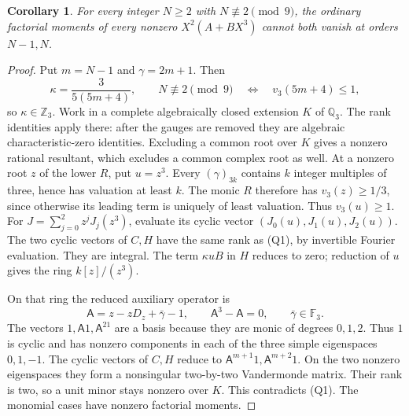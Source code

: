 \documentclass[11pt]{article}
\newtheorem{corollary}[theorem]{Corollary}
\begin{document}
\begin{corollary}\label{cor:gap-three-lower-two-eight-ninths}
For every integer $N\ge2$ with $N\not\equiv2\pmod9$, the ordinary
factorial moments of every nonzero $X^2(A+BX^3)$ cannot both vanish
at orders $N-1,N$.
\end{corollary}
\begin{proof}
Put $m=N-1$ and $\gamma=2m+1$. Then
\[
 \kappa=\frac3{5(5m+4)},\qquad
 N\not\equiv2\pmod9\quad\Longleftrightarrow\quad
                         v_3(5m+4)\le1,
\]
so $\kappa\in\mathbb Z_3$.
Work in a complete algebraically closed extension $K$ of $\mathbb Q_3$.
The rank identities apply there: after the gauges are removed they
are algebraic characteristic-zero identities.
Excluding a common root over $K$ gives a nonzero rational resultant,
which excludes a common complex root as well.
At a nonzero root $z$ of the lower $R$, put $u=z^3$.
Every $(\gamma)_{3k}$ contains $k$ integer multiples of three, hence
has valuation at least $k$. The monic $R$ therefore has
$v_3(z)\ge1/3$, since otherwise its leading term is uniquely of
least valuation. Thus $v_3(u)\ge1$.
For $J=\sum_{j=0}^2z^jJ_j(z^3)$, evaluate its cyclic vector
$(J_0(u),J_1(u),J_2(u))$. The two cyclic vectors of $C,H$
have the same rank as (Q1), by invertible Fourier evaluation.
They are integral. The term $\kappa uB$ in $H$ reduces to zero;
reduction of $u$ gives the ring $k[z]/(z^3)$.

On that ring the reduced auxiliary operator is
\[
 \mathsf A=z-zD_z+\bar\gamma-1,\qquad \mathsf A^3-\mathsf A=0,
                       \qquad\bar\gamma\in\mathbb F_3.
\]
The vectors $1,\mathsf A1,\mathsf A^21$ are a basis because they
are monic of degrees $0,1,2$. Thus $1$ is cyclic and has nonzero
components in each of the three simple eigenspaces $0,1,-1$.
The cyclic vectors of $C,H$ reduce to
$\mathsf A^{m+1}1,\mathsf A^{m+2}1$.
On the two nonzero eigenspaces they form a nonsingular two-by-two
Vandermonde matrix. Their rank is two, so a unit minor stays
nonzero over $K$. This contradicts (Q1).
The monomial cases have nonzero factorial moments.
\end{proof}
\end{document}
